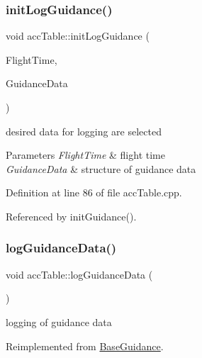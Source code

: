 \subsubsection{\texorpdfstring{init\+Log\+Guidance()}{initLogGuidance()}}
{\footnotesize\ttfamily void acc\+Table\+::init\+Log\+Guidance (\begin{DoxyParamCaption}\item[{\hyperlink{group___tools_ga3f1431cb9f76da10f59246d1d743dc2c}{Float64} \&}]{Flight\+Time,  }\item[{Guidance\+Struct \&}]{Guidance\+Data }\end{DoxyParamCaption})\hspace{0.3cm}{\ttfamily [virtual]}}



desired data for logging are selected 


\begin{DoxyParams}{Parameters}
{\em Flight\+Time} & flight time \\
\hline
{\em Guidance\+Data} & structure of guidance data \\
\hline
\end{DoxyParams}


Definition at line 86 of file acc\+Table.\+cpp.



Referenced by init\+Guidance().

\mbox{\label{classacc_table_ace4665dcb6e791bbd30ba0f0abb79461}} 
\subsubsection{\texorpdfstring{log\+Guidance\+Data()}{logGuidanceData()}}
{\footnotesize\ttfamily void acc\+Table\+::log\+Guidance\+Data (\begin{DoxyParamCaption}{ }\end{DoxyParamCaption})\hspace{0.3cm}{\ttfamily [virtual]}}



logging of guidance data 



Reimplemented from \hyperlink{class_base_guidance_af3bd60f6f17739864fbfa3ec2467ae04}{Base\+Guidance}.



